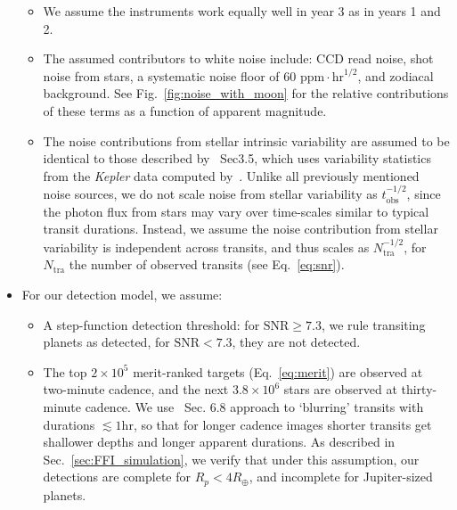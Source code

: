 \begin{itemize}
\begin{itemize}
	 \item We assume the instruments work equally well in year 3
           as in years 1 and 2.
           
	 \item The assumed contributors to white noise include: CCD
           read noise, shot noise from stars, a systematic noise floor
           of 60 $\mathrm{ppm}\cdot\mathrm{hr}^{1/2}$, and zodiacal
           background. See Fig.~\ref{fig:noise_with_moon} for the
           relative contributions of these terms as a function of
           apparent magnitude.
           
	\item The noise contributions from stellar intrinsic
          variability are assumed to be identical to those described
          by~ Sec3.5, which uses variability
          statistics from the \textit{Kepler} data computed
          by~\citet{basri_comparison_2013}.  Unlike all previously
          mentioned noise sources, we do not scale noise from stellar
          variability as $t_\mathrm{obs}^{-1/2}$, since the photon
          flux from stars may vary over time-scales similar to typical
          transit durations.  Instead, we assume the noise
          contribution from stellar variability is independent across
          transits, and thus scales as $N_\mathrm{tra}^{-1/2}$, for
          $N_\mathrm{tra}$ the number of observed transits (see 
          Eq.~\ref{eq:snr}).
	  \end{itemize}
          
	\item For our detection model, we assume:

	  \begin{itemize}

	  \item A step-function detection threshold: for $\mathrm{SNR}
            \geq 7.3$, we rule transiting planets as detected, for
            $\mathrm{SNR} < 7.3$, they are not detected.
            
	\item The top $2\times 10^5$ merit-ranked targets
          (Eq.~\ref{eq:merit}) are observed at two-minute cadence, and
          the next $3.8\times10^6$ stars are observed at thirty-minute
          cadence.  We use~ Sec. 6.8
          approach to `blurring' transits with durations $\lesssim
          1\mathrm{hr}$, so that for longer cadence images shorter
          transits get shallower depths and longer apparent durations.
          As described in Sec.~\ref{sec:FFI_simulation}, we verify
          that under this assumption, our detections are complete for
          $R_p<4R_\oplus$, and incomplete for Jupiter-sized planets.
                

\end{itemize}
\end{itemize}
